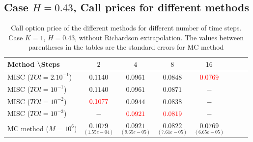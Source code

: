 \documentclass[11pt]{article}
\begin{document}
\subsection{Case $H=0.43$, Call prices for different methods}\label{appendix:Case $H=0.43$, Call prices for different methods}

\begin{table}[h!]
	\centering
	\begin{tabular}{l*{6}{c}r}
		Method \textbackslash  Steps            & $2$ & $4$ & $8$ & $16$ &   \\
		\hline
		MISC ($TOl=2.10^{-1}$)  & $0.1140$ & $0.0961$ & $0.0848$ & ${\color{red}0.0769}$  \\
		MISC ($TOl=10^{-1}$)  & $0.1140$ & $0.0961$ & $0.0871$ & $-$  \\
		MISC ($TOl=10^{-2}$)  & ${\color{red}0.1077}$ & $0.0944$ & $0.0838$ & $-$  \\
		MISC ($TOl=10^{-3}$)  & $-$ & ${\color{red}0.0921}$ & ${\color{red}0.0819}$ & $-$  \\
		MC method ($M=10^{6}$)   & $\underset{(1.55e-04)}{0.1079}$ & $ \underset{(9.65e-05)}{0.0921}$  & $ \underset{(7.61e-05)}{0.0822}$ & $ \underset{(6.65e-05)}{0.0769}$ \\		
		
		\hline
	\end{tabular}
	\caption{ Call option price of the different methods for different number of time steps. Case $K=1$, $H=0.43$, without Richardson extrapolation.  The values between parentheses in the tables are the standard errors for MC method}
	\label{table: Call option price of the different methods for different number of time steps. Case $K=1$, $H=0.43$}
\end{table}
\end{document}

